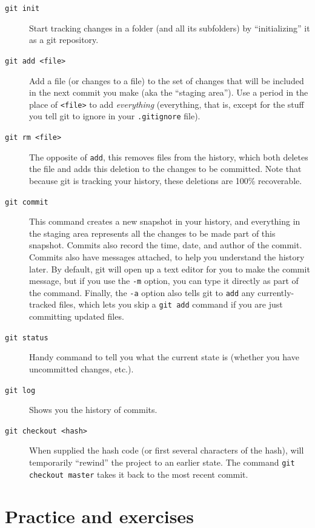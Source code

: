 \documentclass{article}
\begin{document}
\begin{description}
\item[\texttt{git init}] Start tracking changes in a folder (and all its subfolders) by ``initializing'' it as a git repository.
\item[\texttt{git add <file>}] Add a file (or changes to a file) to the set of changes that will be included in the next commit you make (aka the ``staging area'').  Use a period in the place of \texttt{<file>} to add \emph{everything} (everything, that is, except for the stuff you tell git to ignore in your \texttt{.gitignore} file).
\item[\texttt{git rm <file>}] The opposite of \texttt{add}, this removes files from the history, which both deletes the file and adds this deletion to the changes to be committed. Note that because git is tracking your history, these deletions are 100\% recoverable.
\item[\texttt{git commit}] This command creates a new snapshot in your history, and everything in the staging area represents all the changes to be made part of this snapshot.  Commits also record the time, date, and author of the commit. Commits also have messages attached, to help you understand the history later. By default, git will open up a text editor for you to make the commit message, but if you use the \texttt{-m} option, you can type it directly as part of the command. Finally, the \texttt{-a} option also tells git to \texttt{add} any currently-tracked files, which lets you skip a \texttt{git add} command if you are just committing updated files.
\item[\texttt{git status}] Handy command to tell you what the current state is (whether you have uncommitted changes, etc.).
\item[\texttt{git log}] Shows you the history of commits.
\item[\texttt{git checkout <hash>}] When supplied the hash code (or first several characters of the hash), will temporarily ``rewind'' the project to an earlier state. The command \texttt{git checkout master} takes it back to the most recent commit.
\end{description}
\section{Practice and exercises}
\label{sec-12}
\end{document}

